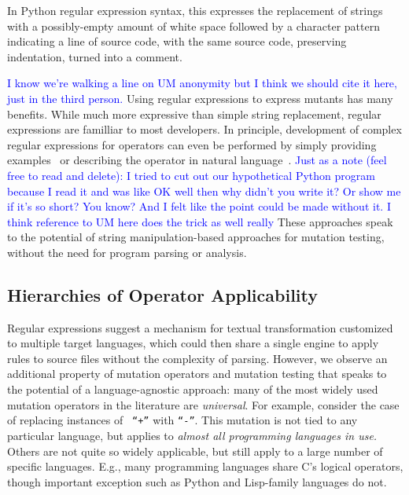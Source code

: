 \documentclass[sigconf,review, anonymous]{acmart}
\newcommand{\clg}[1]{\textcolor{blue}{#1}}
\begin{document}
In Python regular expression syntax, this expresses the replacement of
strings with a possibly-empty amount of white space followed by a
character pattern indicating a line of source code, with the same
source code, preserving indentation, turned into a comment.

\clg{I know we're walking a line on UM anonymity but I think we should cite it
  here, just in the third person.}
Using regular expressions to express mutants has many benefits.  While
much more expressive than simple string replacement, regular
expressions are familliar to most developers.  In principle,
development of complex regular expressions for operators can even be
performed by simply providing examples~\cite{bartoli2014automatic}  or
describing the operator in natural
language~\cite{zhong2018generating}.  
\clg{Just as a note (feel free to read and delete): I tried to cut out our
  hypothetical Python program because I read it and was like OK well then why
  didn't you write it? Or show me if it's so short? You know? And I felt like
  the point could be made without it. I think reference to UM here does the
  trick as well really}
These approaches speak to the potential of string manipulation-based approaches
for mutation testing, without the need for program parsing or analysis. 


\subsection{Hierarchies of Operator Applicability}

Regular expressions suggest a mechanism for textual transformation customized to
multiple target languages, which could then share a single engine to apply rules
to source files without the complexity of parsing. 
However, we observe an additional property of mutation operators and mutation
testing that speaks to the potential of a language-agnostic approach: many of the
most widely used mutation operators in the literature are \emph{universal}.  For
example, consider the case of replacing instances of {\tt
  ``+''}  with {\tt ``-''}.  This mutation is not tied to any
particular language, but applies to \emph{almost all programming
  languages in use.}  Others are not quite
so widely applicable, but still apply to a large number of specific
languages.  E.g., many programming languages share C's logical
operators, though important exception such as Python and Lisp-family
languages do not.
\end{document}
